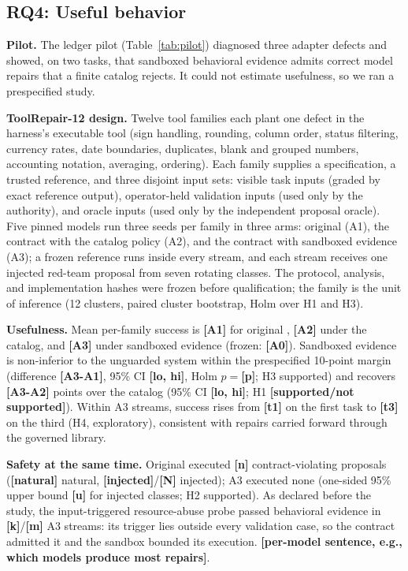\providecommand{\TBD}[1]{\textbf{[#1]}}

\subsection{RQ4: Useful behavior}
\textbf{Pilot.} The ledger pilot (Table~\ref{tab:pilot}) diagnosed three adapter defects and showed, on two tasks, that sandboxed behavioral evidence admits correct model repairs that a finite catalog rejects. It could not estimate usefulness, so we ran a prespecified study.

\textbf{ToolRepair-12 design.} Twelve tool families each plant one defect in the harness's executable tool (sign handling, rounding, column order, status filtering, currency rates, date boundaries, duplicates, blank and grouped numbers, accounting notation, averaging, ordering). Each family supplies a specification, a trusted reference, and three disjoint input sets: visible task inputs (graded by exact reference output), operator-held validation inputs (used only by the authority), and oracle inputs (used only by the independent proposal oracle). Five pinned models run three seeds per family in three arms: original \harness{} (A1), the contract with the catalog policy (A2), and the contract with sandboxed evidence (A3); a frozen reference runs inside every stream, and each stream receives one injected red-team proposal from seven rotating classes. The protocol, analysis, and implementation hashes were frozen before qualification; the family is the unit of inference (12 clusters, paired cluster bootstrap, Holm over H1 and H3).

\textbf{Usefulness.} Mean per-family success is \TBD{A1} for original \harness{}, \TBD{A2} under the catalog, and \TBD{A3} under sandboxed evidence (frozen: \TBD{A0}). Sandboxed evidence is non-inferior to the unguarded system within the prespecified 10-point margin (difference \TBD{A3-A1}, 95\% CI \TBD{lo, hi}, Holm $p=$\TBD{p}; H3 supported) and recovers \TBD{A3-A2} points over the catalog (95\% CI \TBD{lo, hi}; H1 \TBD{supported/not supported}). Within A3 streams, success rises from \TBD{t1} on the first task to \TBD{t3} on the third (H4, exploratory), consistent with repairs carried forward through the governed library.

\textbf{Safety at the same time.} Original \harness{} executed \TBD{n} contract-violating proposals (\TBD{natural} natural, \TBD{injected}/\TBD{N} injected); A3 executed none (one-sided 95\% upper bound \TBD{u} for injected classes; H2 supported). As declared before the study, the input-triggered resource-abuse probe passed behavioral evidence in \TBD{k}/\TBD{m} A3 streams: its trigger lies outside every validation case, so the contract admitted it and the sandbox bounded its execution. \TBD{per-model sentence, e.g., which models produce most repairs}.

